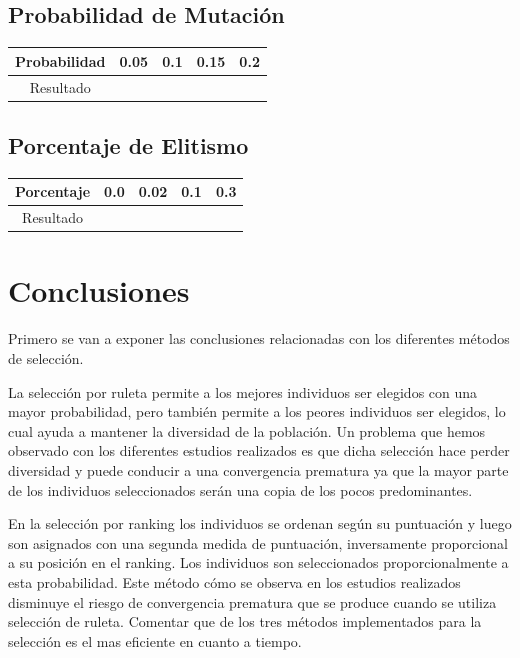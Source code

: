 \documentclass[12pt]{article}
\begin{document}
	

\subsection{Probabilidad de Mutación}
\begin{table}[H]
\begin{center}
\begin{tabular}{|ccccc|} \hline
Probabilidad   & 0.05 & 0.1 & 0.15 & 0.2 \\  \hline
Resultado  &   &  &  &  \\ \hline
\end{tabular}
\end{center}
\end{table}

	

\subsection{Porcentaje de Elitismo}
\begin{table}[H]
\begin{center}
\begin{tabular}{|ccccc|} \hline
Porcentaje   & 0.0 & 0.02 & 0.1 & 0.3 \\  \hline
Resultado  &  &  &  &  \\ \hline
\end{tabular}
\end{center}
\end{table}

	


\section{Conclusiones}

Primero se van a exponer las conclusiones relacionadas con los diferentes métodos de selección.

La selección por ruleta permite a los mejores individuos ser elegidos con una mayor probabilidad, pero también permite a los peores individuos ser elegidos, lo cual ayuda a mantener la diversidad de la población.
Un problema que hemos observado con los diferentes estudios realizados es que dicha selección hace perder diversidad y puede conducir a una convergencia prematura ya que la mayor parte de los individuos seleccionados serán una copia de los pocos predominantes.

En la selección por ranking los individuos se ordenan según su puntuación y luego son asignados con una segunda medida de puntuación, inversamente proporcional a su posición en el ranking. Los individuos son seleccionados proporcionalmente a esta probabilidad. Este método cómo se observa en los estudios realizados disminuye el riesgo de convergencia prematura que se produce cuando se utiliza selección de ruleta. Comentar que de los tres métodos implementados para la selección es el mas eficiente en cuanto a tiempo.
\end{document}
